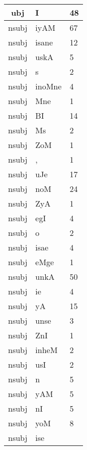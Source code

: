 \documentclass[a4 paper]{article}
\begin{document}
\begin{longtable}{cp{}p{}}
ubj & I & 48\\ \midrule nsubj & iyAM & 67\\ \midrule nsubj & isane & 12\\ \midrule nsubj & uskA & 5\\ \midrule nsubj & s & 2\\ \midrule nsubj & inoMne & 4\\ \midrule nsubj & Mne & 1\\ \midrule nsubj & BI & 14\\ \midrule nsubj & Ms & 2\\ \midrule nsubj & ZoM & 1\\ \midrule nsubj & , & 1\\ \midrule nsubj & uJe & 17\\ \midrule nsubj & noM & 24\\ \midrule nsubj & ZyA & 1\\ \midrule nsubj & egI & 4\\ \midrule nsubj & o & 2\\ \midrule nsubj & isae & 4\\ \midrule nsubj & eMge & 1\\ \midrule nsubj & unkA & 50\\ \midrule nsubj & ie & 4\\ \midrule nsubj & yA & 15\\ \midrule nsubj & unse & 3\\ \midrule nsubj & ZnI & 1\\ \midrule nsubj & inheM & 2\\ \midrule nsubj & usI & 2\\ \midrule nsubj & n & 5\\ \midrule nsubj & yAM & 5\\ \midrule nsubj & nI & 5\\ \midrule nsubj & yoM & 8\\ \midrule nsubj & ise & 
\end{longtable}
\end{document}

